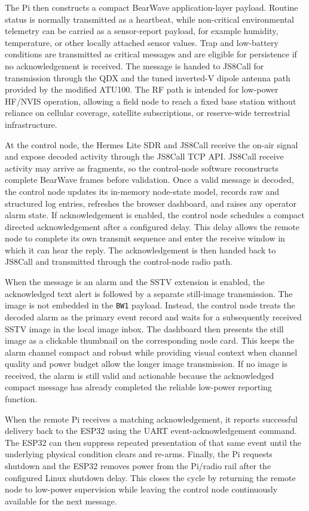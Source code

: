 \documentclass[acmsmall,screen]{acmart}
\begin{document}
The Pi then constructs a compact BearWave application-layer payload. Routine status is normally transmitted as a heartbeat, while non-critical environmental telemetry can be carried as a sensor-report payload, for example humidity, temperature, or other locally attached sensor values. Trap and low-battery conditions are transmitted as critical messages and are eligible for persistence if no acknowledgement is received. The message is handed to JS8Call for transmission through the QDX and the tuned inverted-V dipole antenna path provided by the modified ATU100. The RF path is intended for low-power HF/NVIS operation, allowing a field node to reach a fixed base station without reliance on cellular coverage, satellite subscriptions, or reserve-wide terrestrial infrastructure.

At the control node, the Hermes Lite SDR and JS8Call receive the on-air signal and expose decoded activity through the JS8Call TCP API. JS8Call receive activity may arrive as fragments, so the control-node software reconstructs complete BearWave frames before validation. Once a valid message is decoded, the control node updates its in-memory node-state model, records raw and structured log entries, refreshes the browser dashboard, and raises any operator alarm state. If acknowledgement is enabled, the control node schedules a compact directed acknowledgement after a configured delay. This delay allows the remote node to complete its own transmit sequence and enter the receive window in which it can hear the reply. The acknowledgement is then handed back to JS8Call and transmitted through the control-node radio path.

When the message is an alarm and the SSTV extension is enabled, the acknowledged text alert is followed by a separate still-image transmission. The image is not embedded in the \texttt{BW1} payload. Instead, the control node treats the decoded alarm as the primary event record and waits for a subsequently received SSTV image in the local image inbox. The dashboard then presents the still image as a clickable thumbnail on the corresponding node card. This keeps the alarm channel compact and robust while providing visual context when channel quality and power budget allow the longer image transmission. If no image is received, the alarm is still valid and actionable because the acknowledged compact message has already completed the reliable low-power reporting function.

When the remote Pi receives a matching acknowledgement, it reports successful delivery back to the ESP32 using the UART event-acknowledgement command. The ESP32 can then suppress repeated presentation of that same event until the underlying physical condition clears and re-arms. Finally, the Pi requests shutdown and the ESP32 removes power from the Pi/radio rail after the configured Linux shutdown delay. This closes the cycle by returning the remote node to low-power supervision while leaving the control node continuously available for the next message.
\end{document}
